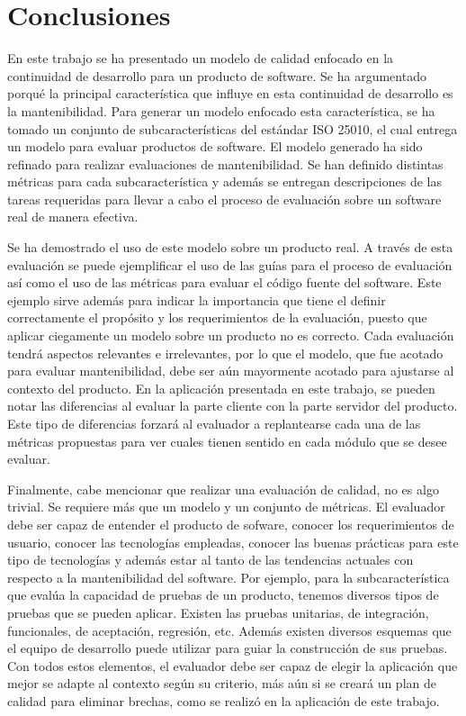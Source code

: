 \chapter{Conclusiones}
\label{chap:conclusiones}

En este trabajo se ha presentado un modelo de calidad enfocado en la continuidad
de desarrollo para un producto de software. Se ha argumentado porqué la principal característica
que influye en esta continuidad de desarrollo es la mantenibilidad.
Para generar un modelo enfocado esta característica, se ha tomado un conjunto
de subcaracterísticas del estándar ISO 25010, el cual entrega un modelo para
evaluar productos de software. El modelo generado ha sido
refinado para realizar evaluaciones de mantenibilidad. Se han
definido distintas métricas para cada subcaracterística y además se entregan
descripciones de las tareas requeridas para llevar a cabo el proceso de evaluación
sobre un software real de manera efectiva.

Se ha demostrado el uso de este modelo sobre un producto real. A través de esta
evaluación se puede ejemplificar el uso de las guías para el proceso de evaluación
así como el uso de las métricas para evaluar el código fuente del software.
Este ejemplo sirve además para indicar la importancia que tiene el definir correctamente
el propósito y los requerimientos de la evaluación, puesto que aplicar
ciegamente un modelo sobre un producto no es correcto. Cada evaluación tendrá
aspectos relevantes e irrelevantes, por lo que el modelo, que fue acotado
para evaluar mantenibilidad, debe ser aún mayormente acotado para ajustarse
al contexto del producto. En la aplicación presentada en este trabajo, se pueden
notar las diferencias al evaluar la parte cliente con la parte servidor del producto.
Este tipo de diferencias forzará al evaluador a replantearse cada una de las métricas
propuestas para ver cuales tienen sentido en cada módulo que se desee evaluar.

Finalmente, cabe mencionar que realizar una evaluación de calidad, no es algo trivial.
Se requiere más que un modelo y un conjunto de métricas. El evaluador debe ser
capaz de entender el producto de sofware, conocer los requerimientos de usuario,
conocer las tecnologías empleadas, conocer las buenas prácticas para este tipo
de tecnologías y además estar al tanto de las tendencias actuales con respecto
a la mantenibilidad del software. Por ejemplo, para la subcaracterística
que evalúa la capacidad de pruebas de un producto, tenemos diversos tipos
de pruebas que se pueden aplicar. Existen las pruebas unitarias, de integración,
funcionales, de aceptación, regresión, etc. Además existen diversos esquemas
que el equipo de desarrollo puede utilizar para guiar la construcción de sus pruebas.
Con todos estos elementos, el evaluador debe ser capaz de elegir la aplicación
que mejor se adapte al contexto según su criterio, más aún si se creará un plan
de calidad para eliminar brechas, como se realizó en la aplicación de este trabajo.

